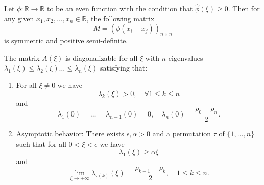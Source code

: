 \documentclass[10pt,a4paper]{amsart}
\begin{document}
\begin{lemma}\label{Bochner lemma}
    Let $\phi:\mathbb{R}\rightarrow\mathbb{R}$ to be an even function with the condition that $\hat{\phi}(\xi)\geq0$. Then for any given  $x_1,x_2,\dots,x_n\in\mathbb{R}$, the following matrix
    \begin{equation}
        M=(\phi(x_i-x_j))_{n\times n}
    \end{equation}
    is symmetric and positive semi-definite.
\end{lemma}

\begin{proposition}\label{prop linear matrix}
    The matrix $A(\xi)$ is diagonalizable for all $\xi$ with $n$ eigenvalues $\lambda_1(\xi)\leq\lambda_2(\xi)\dots\leq\lambda_n(\xi)$ satisfying that:
    \begin{enumerate}[label=(\roman*), ref=(\roman*)]
        \item\label{item:positive-eigenvalues} For all $\xi\neq0$ we have \begin{equation}
            \lambda_k(\xi)>0,\quad \forall 1\leq k\leq n
        \end{equation} 
        and
        \begin{equation}
            \lambda_1(0)=\dots=\lambda_{n-1}(0)=0,\quad \lambda_n(0)=\frac{\rho_0-\rho_n}{2}.
        \end{equation}

        \item\label{item:asymptotic-eigenvalues}Asymptotic behavior: There exists $\epsilon,\alpha>0$ and a permutation \(\tau\) of \(\{1,\dots,n\}\) such that for all $0<\xi<\epsilon$ we have
        \begin{equation}
            \lambda_1(\xi)\geq\alpha\xi
        \end{equation}
        and
        \begin{equation}
            \lim_{\xi\rightarrow+\infty}\lambda_{\tau(k)}(\xi)=\frac{\rho_{k-1}-\rho_k}{2},\quad 1\leq k\leq n.
        \end{equation}
    \end{enumerate}
\end{proposition}
\end{document}
